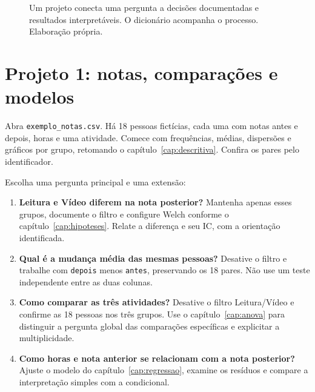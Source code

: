 \begin{figure}[H]
\centering
{}
\caption{Um projeto conecta uma pergunta a decisões documentadas e resultados interpretáveis. O dicionário acompanha o processo. Elaboração própria.}
\label{fig:trilha-projeto}
\end{figure}

\section{Projeto 1: notas, comparações e modelos}

Abra \texttt{exemplo\_notas.csv}. Há 18 pessoas fictícias, cada uma com notas antes e depois, horas e uma atividade. Comece com frequências, médias, dispersões e gráficos por grupo, retomando o capítulo~\ref{cap:descritiva}. Confira os pares pelo identificador.

Escolha uma pergunta principal e uma extensão:

\begin{enumerate}
  \item \textbf{Leitura e Vídeo diferem na nota posterior?} Mantenha apenas esses grupos, documente o filtro e configure Welch conforme o capítulo~\ref{cap:hipoteses}. Relate a diferença e seu IC, com a orientação identificada.
  \item \textbf{Qual é a mudança média das mesmas pessoas?} Desative o filtro e trabalhe com \texttt{depois} menos \texttt{antes}, preservando os 18 pares. Não use um teste independente entre as duas colunas.
  \item \textbf{Como comparar as três atividades?} Desative o filtro Leitura/Vídeo e confirme as 18 pessoas nos três grupos. Use o capítulo~\ref{cap:anova} para distinguir a pergunta global das comparações específicas e explicitar a multiplicidade.
  \item \textbf{Como horas e nota anterior se relacionam com a nota posterior?} Ajuste o modelo do capítulo~\ref{cap:regressao}, examine os resíduos e compare a interpretação simples com a condicional.
\end{enumerate}

